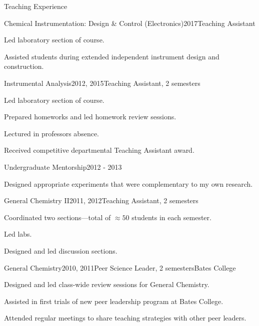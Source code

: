 \documentclass{resume}  %
\begin{document}
\begin{rSection}{Teaching Experience}

\begin{rSubsection}{Chemical Instrumentation: Design \& Control (Electronics)}{2017}{Teaching Assistant}{}
\item Led laboratory section of course.
\item Assisted students during extended independent instrument design and construction.
\end{rSubsection}

\begin{rSubsection}{Instrumental Analysis}{2012, 2015}{Teaching Assistant, 2 semesters}{}
\item Led laboratory section of course.
\item Prepared homeworks and led homework review sessions.
\item Lectured in professors absence.
\item Received competitive departmental Teaching Assistant award.
\end{rSubsection}

\begin{rSubsection}{Undergraduate Mentorship}{2012 - 2013}{}{}
\item Designed appropriate experiments that were complementary to my own research.
\end{rSubsection}

\pagebreak
\begin{rSubsection}{General Chemistry II}{2011, 2012}{Teaching Assistant, 2 semesters}{}
\item Coordinated two sections---total of $\approx50$ students in each semester.
\item Led labs.
\item Designed and led discussion sections.
\end{rSubsection}

\begin{rSubsection}{General Chemistry}{2010, 2011}{Peer Science Leader, 2 semesters}{Bates College}
\item Designed and led class-wide review sessions for General Chemistry.
\item Assisted in first trials of new peer leadership program at Bates College.
\item Attended regular meetings to share teaching strategies with other peer leaders.
\end{rSubsection}

\end{rSection}
\end{document}
